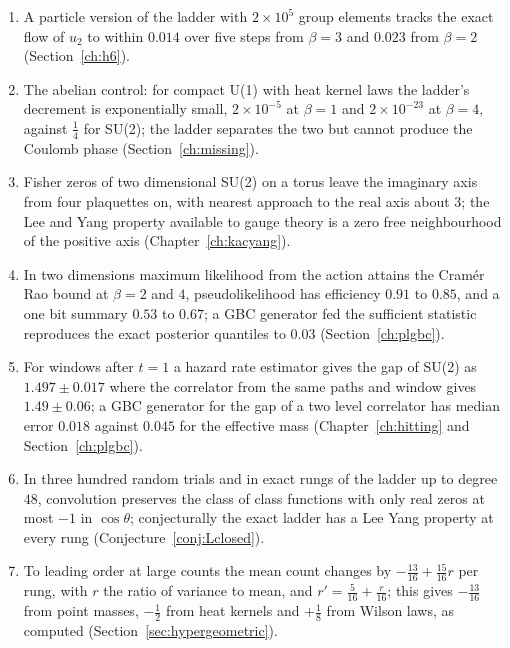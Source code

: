 \begin{enumerate}
\item A particle version of the ladder with $2\times10^5$ group elements tracks the exact flow of $u_2$ to within $0.014$ over five steps from $\beta=3$ and $0.023$ from $\beta=2$ (Section~\ref{ch:h6}).
\item The abelian control: for compact U(1) with heat kernel laws the ladder's decrement is exponentially small, $2\times10^{-5}$ at $\beta=1$ and $2\times10^{-23}$ at $\beta=4$, against $\frac14$ for SU(2); the ladder separates the two but cannot produce the Coulomb phase (Section~\ref{ch:missing}).
\item Fisher zeros of two dimensional SU(2) on a torus leave the imaginary axis from four plaquettes on, with nearest approach to the real axis about $3$; the Lee and Yang property available to gauge theory is a zero free neighbourhood of the positive axis (Chapter~\ref{ch:kacyang}).
\item In two dimensions maximum likelihood from the action attains the Cram\'er Rao bound at $\beta=2$ and $4$, pseudolikelihood has efficiency $0.91$ to $0.85$, and a one bit summary $0.53$ to $0.67$; a GBC generator fed the sufficient statistic reproduces the exact posterior quantiles to $0.03$ (Section~\ref{ch:plgbc}).
\item For windows after $t=1$ a hazard rate estimator gives the gap of SU(2) as $1.497\pm0.017$ where the correlator from the same paths and window gives $1.49\pm0.06$; a GBC generator for the gap of a two level correlator has median error $0.018$ against $0.045$ for the effective mass (Chapter~\ref{ch:hitting} and Section~\ref{ch:plgbc}).
\item In three hundred random trials and in exact rungs of the ladder up to degree $48$, convolution preserves the class of class functions with only real zeros at most $-1$ in $\cos\theta$; conjecturally the exact ladder has a Lee Yang property at every rung (Conjecture~\ref{conj:Lclosed}).
\item To leading order at large counts the mean count changes by $-\frac{13}{16}+\frac{15}{16}r$ per rung, with $r$ the ratio of variance to mean, and $r'=\frac5{16}+\frac r{16}$; this gives $-\frac{13}{16}$ from point masses, $-\frac12$ from heat kernels and $+\frac18$ from Wilson laws, as computed (Section~\ref{sec:hypergeometric}).

\end{enumerate}
